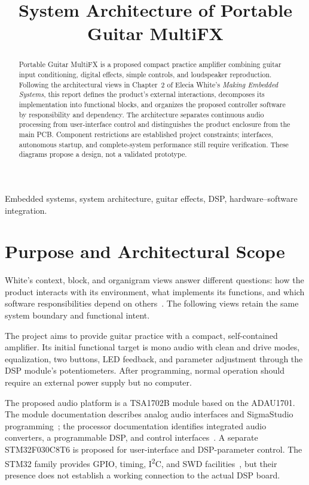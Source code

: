 \documentclass[conference]{IEEEtran}
\title{System Architecture of Portable Guitar MultiFX}
\author{
  \IEEEauthorblockN{Javier Estiven Le\'on Calder\'on}
  \IEEEauthorblockA{
    Electronic Engineering\\
    Universidad Nacional de Colombia
  }
}
\begin{document}
\maketitle

\begin{abstract}
Portable Guitar MultiFX is a proposed compact practice amplifier combining
guitar input conditioning, digital effects, simple controls, and loudspeaker
reproduction. Following the architectural views in Chapter~2 of Elecia
White's \emph{Making Embedded Systems}, this report defines the product's
external interactions, decomposes its implementation into functional blocks,
and organizes the proposed controller software by responsibility and
dependency. The architecture separates continuous audio processing from
user-interface control and distinguishes the product enclosure from the
main PCB. Component restrictions are established project constraints;
interfaces, autonomous startup, and complete-system performance still
require verification. These diagrams propose a design, not a validated
prototype.
\end{abstract}

\begin{IEEEkeywords}
Embedded systems, system architecture, guitar effects, DSP, hardware--software
integration.
\end{IEEEkeywords}

\section{Purpose and Architectural Scope}

White's context, block, and organigram views answer different questions:
how the product interacts with its environment, what implements its
functions, and which software responsibilities depend on others~\cite{white}.
The following views retain the same system boundary and functional intent.

The project aims to provide guitar practice with a compact, self-contained
amplifier. Its initial functional target is mono audio with clean and drive
modes, equalization, two buttons, LED feedback, and parameter adjustment
through the DSP module's potentiometers. After programming, normal operation
should require an external power supply but no computer.

The proposed audio platform is a TSA1702B module based on the ADAU1701.
The module documentation describes analog audio interfaces and SigmaStudio
programming~\cite{tsa}; the processor documentation identifies integrated
audio converters, a programmable DSP, and control interfaces~\cite{adau}.
A separate STM32F030C8T6 is proposed for user-interface and DSP-parameter
control. The STM32 family provides GPIO, timing, I\textsuperscript{2}C, and
SWD facilities~\cite{stm}, but their presence does not establish a working
connection to the actual DSP board.
\end{document}
